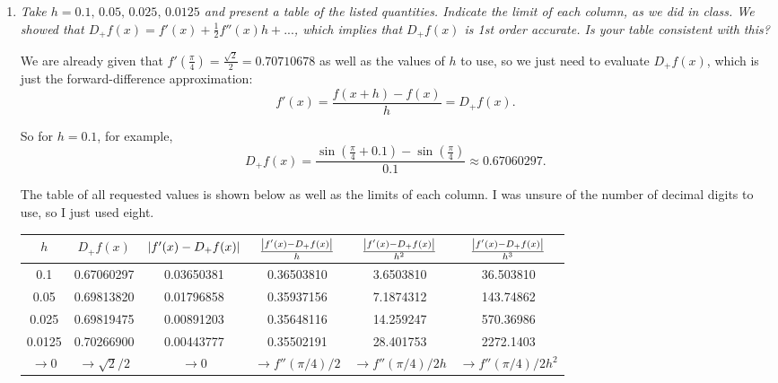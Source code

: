 \begin{enumerate}[label=(\alph*)]

  \item \textit{Take $h = 0.1, \,0.05, \,0.025, \,0.0125$ and present a table of the listed quantities. Indicate the limit of each column, as we did in class. We showed that $D_{+} f(x) = f'(x) + \frac{1}{2}f''(x)h + ...$, which implies that $D_{+} f(x)$ is 1st order accurate. Is your table consistent with this?}
      \vspace{1em}
      \newpage

    We are already given that $f'(\frac{\pi}{4}) = \frac{\sqrt{2}}{2} = 0.70710678$ as well as the values of $h$ to use, so we just need to evaluate $D_{+}f(x)$, which is just the forward-difference approximation:
    \begin{equation*}
      f'(x) = \frac{f(x+h)-f(x)}{h} = D_{+}f(x).
    \end{equation*}

    So for $h=0.1$, for example,
    \begin{equation*}
      D_{+}f(x) = \frac{\sin{\left(\frac{\pi}{4}+0.1\right)}-\sin{\left(\frac{\pi}{4}\right)}}{0.1} \approx 0.67060297. 
    \end{equation*}

    The table of all requested values is shown below as well as the limits of each column. I was unsure of the number of decimal digits to use, so I just used eight.

    \begin{table}[h!]
      \centering
      \begin{tabular}{|c|c|c|c|c|c|}
        \hline
        \rule{0pt}{3ex}$h$ & $D_{+}f(x)$ & $\abs{f'(x) - D_{+}f(x)}$ & $\frac{\abs{f'(x) - D_{+}f(x)}}{h}$ & $\frac{\abs{f'(x) - D_{+}f(x)}}{h^{2}}$ & $\frac{\abs{f'(x) - D_{+}f(x)}}{h^{3}}$ \\
        \hline
        0.1    & 0.67060297 & 0.03650381 & 0.36503810 & 3.6503810 & 36.503810 \\
        0.05   & 0.69813820 & 0.01796858 & 0.35937156 & 7.1874312 & 143.74862 \\
        0.025  & 0.69819475 & 0.00891203 & 0.35648116 & 14.259247 & 570.36986 \\
        0.0125 & 0.70266900 & 0.00443777 & 0.35502191 & 28.401753 & 2272.1403 \\
        \hline
        \multicolumn{1}{|c|}{\rule{0pt}{2.5ex}$\rightarrow 0$} & \multicolumn{1}{c|}{\rule{0pt}{2.5ex}$\rightarrow \sqrt{2}/2$} & \multicolumn{1}{c|}{\rule{0pt}{2.5ex}$\rightarrow 0$} & \multicolumn{1}{c|}{\rule{0pt}{2.5ex}$\rightarrow f''(\pi/4)/2$} & \multicolumn{1}{c|}{\rule{0pt}{2.5ex}$\rightarrow f''(\pi/4)/2h$} & \multicolumn{1}{c|}{\rule{0pt}{2.5ex}$\rightarrow f''(\pi/4)/2h^{2}$} \\
        \hline
      \end{tabular}
    \end{table}


\end{enumerate}
